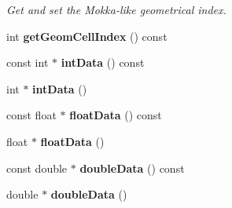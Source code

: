 \begin{DoxyCompactItemize}
\begin{DoxyCompactList}\small\item\em Get and set the Mokka-\/like geometrical index. \item\end{DoxyCompactList}\item 
int {\bfseries getGeomCellIndex} () const \label{classCALICE_1_1NoiseParameter_a2e5ecdf5faaddbdf33001f4ca61c5b62}

\item 
const int $\ast$ {\bfseries intData} () const \label{classCALICE_1_1NoiseParameter_ab49c24a64e65f2233dcde0c1eec61781}

\item 
int $\ast$ {\bfseries intData} ()\label{classCALICE_1_1NoiseParameter_a70ec4f6c64502b5db07d3ea74c2e46dd}

\item 
const float $\ast$ {\bfseries floatData} () const \label{classCALICE_1_1NoiseParameter_a43e6abb3eb0f278e4ec8b6f0a7b91ca2}

\item 
float $\ast$ {\bfseries floatData} ()\label{classCALICE_1_1NoiseParameter_a5044799613596b5e3547e2c9e01e9098}

\item 
const double $\ast$ {\bfseries doubleData} () const \label{classCALICE_1_1NoiseParameter_a17f9f7964cbde3a5b67bfcac3412dd23}

\item 
double $\ast$ {\bfseries doubleData} ()\label{classCALICE_1_1NoiseParameter_ad770a3fe04039177f6913d9490d1443e}

\end{DoxyCompactItemize}
